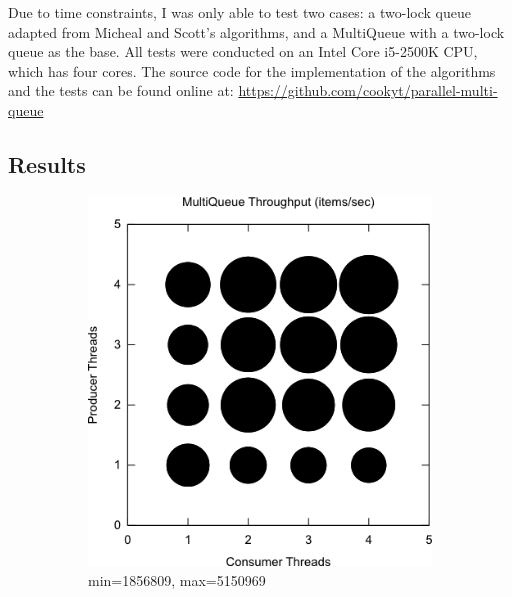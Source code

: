 \documentclass[12pt]{report}
\begin{document}
Due to time constraints, I was only able to test two cases: a two-lock queue
adapted from Micheal and Scott's algorithms\cite{michael1996}, and a MultiQueue
with a two-lock queue as the base. All tests were conducted on an Intel Core
i5-2500K CPU, which has four cores. The source code for the implementation of
the algorithms and the tests can be found online at:
\url{https://github.com/cookyt/parallel-multi-queue}

\subsection{Results}
\begin{figure}[H]
    \centering
    \begin{subfigure}[b]{0.45\textwidth}
        \centering
        \includegraphics[width=\textwidth]{multiqueue.png}
        \caption{min=1856809, max=5150969}
    \end{subfigure}
    \hfill
    \begin{subfigure}[b]{0.45\textwidth}
        \centering

\end{subfigure}
\end{figure}
\end{document}
